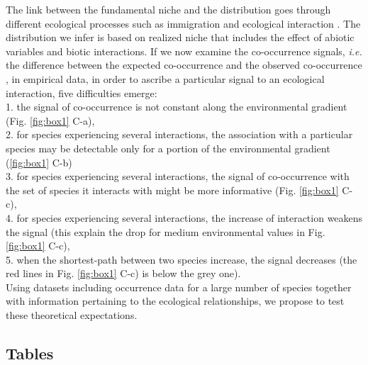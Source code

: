 The link between the fundamental niche and the distribution goes through
different ecological processes such as immigration and ecological
interaction \citep{Pulliam2000, Godsoe2010a}. The distribution we infer
is based on realized niche that includes the effect of abiotic variables
and biotic interactions. If we now examine the co-occurrence signals,
\emph{i.e.} the difference between the expected co-occurrence and the
observed co-occurrence \citep{Cazelles2016}, in empirical data, in order
to ascribe a particular signal to an ecological interaction, five
difficulties emerge:\\
1. the signal of co-occurrence is not constant along the environmental
gradient (Fig. \ref{fig:box1} C-a),\\
2. for species experiencing several interactions, the association with a
particular species may be detectable only for a portion of the
environmental gradient (\ref{fig:box1} C-b)\\
3. for species experiencing several interactions, the signal of
co-occurrence with the set of species it interacts with might be more
informative (Fig. \ref{fig:box1} C-c),\\
4. for species experiencing several interactions, the increase of
interaction weakens the signal (this explain the drop for medium
environmental values in Fig. \ref{fig:box1} C-c),\\
5. when the shortest-path between two species increase, the signal
decreases (the red lines in Fig. \ref{fig:box1} C-c) is below the grey
one).\\
Using datasets including occurrence data for a large number of species
together with information pertaining to the ecological relationships, we
propose to test these theoretical expectations.

\newpage

\subsection{Tables}\label{tables}

